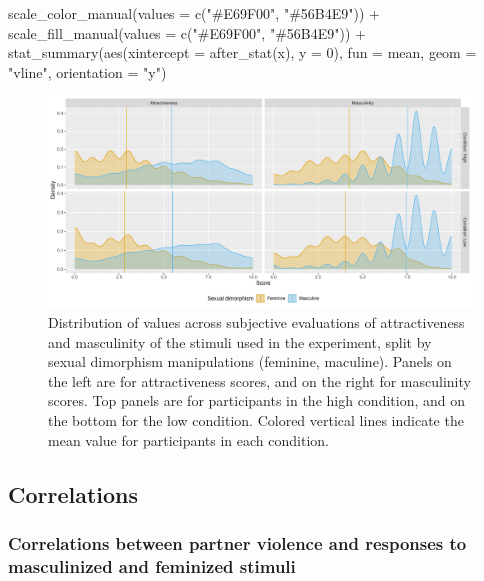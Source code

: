 \documentclass[
  bookmarksnumbered]{article}
\newenvironment{Shaded}{\begin{snugshade}}{\end{snugshade}}
\newcommand{\AttributeTok}[1]{\textcolor[rgb]{0.80,0.80,0.80}{#1}}
\newcommand{\DecValTok}[1]{\textcolor[rgb]{0.86,0.86,0.80}{#1}}
\newcommand{\FunctionTok}[1]{\textcolor[rgb]{0.94,0.94,0.56}{#1}}
\newcommand{\NormalTok}[1]{\textcolor[rgb]{0.80,0.80,0.80}{#1}}
\newcommand{\SpecialCharTok}[1]{\textcolor[rgb]{0.86,0.64,0.64}{#1}}
\newcommand{\StringTok}[1]{\textcolor[rgb]{0.80,0.58,0.58}{#1}}
\begin{document}
\begin{Shaded}
\begin{Highlighting}[]
  \FunctionTok{scale\_color\_manual}\NormalTok{(}\AttributeTok{values =} \FunctionTok{c}\NormalTok{(}\StringTok{"\#E69F00"}\NormalTok{, }\StringTok{"\#56B4E9"}\NormalTok{)) }\SpecialCharTok{+}
  \FunctionTok{scale\_fill\_manual}\NormalTok{(}\AttributeTok{values =} \FunctionTok{c}\NormalTok{(}\StringTok{"\#E69F00"}\NormalTok{, }\StringTok{"\#56B4E9"}\NormalTok{)) }\SpecialCharTok{+}
  \FunctionTok{stat\_summary}\NormalTok{(}\FunctionTok{aes}\NormalTok{(}\AttributeTok{xintercept =} \FunctionTok{after\_stat}\NormalTok{(x), }\AttributeTok{y =} \DecValTok{0}\NormalTok{),}
               \AttributeTok{fun =}\NormalTok{ mean, }\AttributeTok{geom =} \StringTok{"vline"}\NormalTok{, }\AttributeTok{orientation =} \StringTok{"y"}\NormalTok{)}
\end{Highlighting}
\end{Shaded}

\begin{figure}
\centering
\includegraphics{Supplementary_material_files/figure-latex/stimuli-eval-desc-plot-1.pdf}
\caption{\label{fig:stimuli-eval-desc-plot}Distribution of values across subjective evaluations of attractiveness and masculinity of the stimuli used in the experiment, split by sexual dimorphism manipulations (feminine, maculine). Panels on the left are for attractiveness scores, and on the right for masculinity scores. Top panels are for participants in the high condition, and on the bottom for the low condition. Colored vertical lines indicate the mean value for participants in each condition.}
\end{figure}

\subsection{Correlations}\label{correlations}

\subsubsection{Correlations between partner violence and responses to masculinized and feminized stimuli}\label{correlations-between-partner-violence-and-responses-to-masculinized-and-feminized-stimuli}
\end{document}
